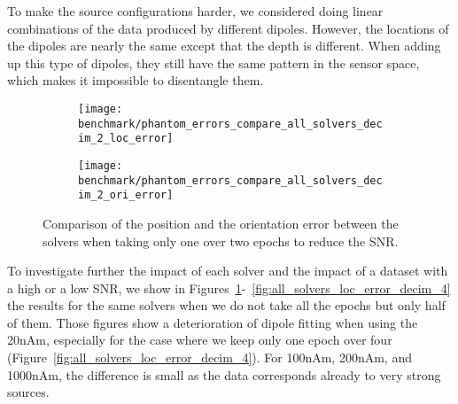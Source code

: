 To make the source configurations harder, we considered doing linear combinations of the data produced by different dipoles. However, the locations of the dipoles are nearly the same except that the depth is different. When adding up this type of dipoles, they still have the same pattern in the sensor space, which makes it impossible to disentangle them.

\begin{figure}[p]
	\centering
    \begin{subfigure}{0.9\linewidth}
		\centering
		\texttt{[image: benchmark/phantom\_errors\_compare\_all\_solvers\_decim\_2\_loc\_error]}
	    \caption{\label{fig:all_solvers_loc_error_decim_2}}
    \end{subfigure}
	\hspace{5cm}
	\hfill
    \begin{subfigure}{0.9\linewidth}  
		\centering 
		\texttt{[image: benchmark/phantom\_errors\_compare\_all\_solvers\_decim\_2\_ori\_error]}
		\caption{\label{fig:all_solvers_ori_error_decim_2}}
	\end{subfigure}

		\caption{Comparison of the position and the orientation error between the solvers when taking only one over two epochs to reduce the SNR.\label{all_solvers_loc_error_decim_2}}
\end{figure}

To investigate further the impact of each solver and the impact of a dataset with a high or a low SNR, we show in Figures~\ref{fig:all_solvers_loc_error_decim_2}-~\ref{fig:all_solvers_loc_error_decim_4} the results for the same solvers when we do not take all the epochs but only half of them. Those figures show a deterioration of dipole fitting when using the 20nAm, especially for the case where we keep only one epoch over four (Figure~\ref{fig:all_solvers_loc_error_decim_4}). For 100nAm, 200nAm, and 1000nAm, the difference is small as the data corresponds already to very strong sources. %

